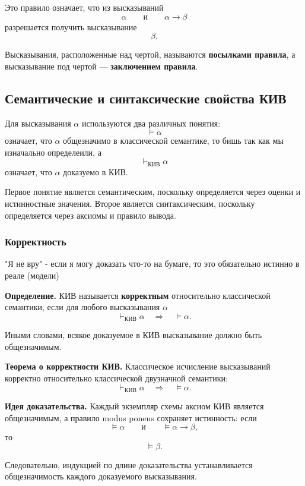 \documentclass[12pt,a4paper,oneside,openany]{book}
\theoremstyle{definition}
\theoremstyle{plain}
\theoremstyle{remark}
\begin{document}
Это правило означает, что из высказываний
\[
\alpha
\qquad\text{и}\qquad
\alpha\to\beta
\]
разрешается получить высказывание
\[
\beta.
\]

Высказывания, расположенные над чертой, называются
\textbf{посылками правила}, а высказывание под чертой ---
\textbf{заключением правила}.


\subsection{Семантические и синтаксические свойства КИВ}

Для высказывания \(\alpha\) используются два различных понятия:
\[
\models\alpha
\]
означает, что \(\alpha\) общезначимо в классической семантике, то бишь так как мы изначально определеили, а
\[
\vdash_{\mathrm{КИВ}}\alpha
\]
означает, что \(\alpha\) доказуемо в КИВ.

Первое понятие является семантическим, поскольку определяется через
оценки и истинностные значения. Второе является синтаксическим,
поскольку определяется через аксиомы и правило вывода.


\subsubsection{Корректность}
\vspace{7mm}
"Я не вру" - если я могу доказать что-то на бумаге, то это обязательно истинно в реале (модели)
\vspace{7mm}

\textbf{Определение.}
КИВ называется \textbf{корректным} относительно классической семантики,
если для любого высказывания \(\alpha\)
\[
\vdash_{\mathrm{КИВ}}\alpha
\quad\Longrightarrow\quad
\models\alpha.
\]

Иными словами, всякое доказуемое в КИВ высказывание должно быть
общезначимым.

\textbf{Теорема о корректности КИВ.}
Классическое исчисление высказываний корректно относительно
классической двузначной семантики:
\[
\vdash_{\mathrm{КИВ}}\alpha
\quad\Longrightarrow\quad
\models\alpha.
\]

\textbf{Идея доказательства.}
Каждый экземпляр схемы аксиом КИВ является общезначимым, а правило
modus ponens сохраняет истинность: если
\[
\models\alpha
\qquad\text{и}\qquad
\models\alpha\to\beta,
\]
то
\[
\models\beta.
\]

Следовательно, индукцией по длине доказательства устанавливается
общезначимость каждого доказуемого высказывания.
\end{document}
